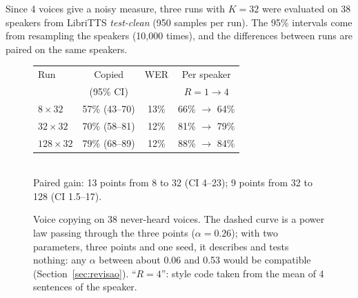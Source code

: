 \documentclass[a4paper,11pt]{article}
\begin{document}
Since 4 voices give a noisy measure, three runs with $K=32$ were evaluated on 38 speakers from LibriTTS \textit{test-clean} (950 samples per run). The 95\% intervals come from resampling the speakers (10,000 times), and the differences between runs are paired on the same speakers.

\begin{figure}[H]
\centering
\begin{minipage}{0.48\textwidth}
\centering
{}
\end{minipage}\hfill
\begin{minipage}{0.48\textwidth}
\small
\begin{tabular}{@{}lccc@{}}
\toprule
Run & Copied & WER & Per speaker\\
 & (95\% CI) & & $R=1 \rightarrow 4$\\
\midrule
$8\times32$ & 57\% (43--70) & 13\% & 66\% $\rightarrow$ 64\%\\
$32\times32$ & 70\% (58--81) & 12\% & 81\% $\rightarrow$ 79\%\\
$128\times32$ & 79\% (68--89) & 12\% & 88\% $\rightarrow$ 84\%\\
\bottomrule
\end{tabular}\\[6pt]
Paired gain: 13 points from 8 to 32 (CI 4--23); 9 points from 32 to 128 (CI 1.5--17).
\end{minipage}
\caption{Voice copying on 38 never-heard voices. The dashed curve is a power law passing through the three points ($\alpha=0.26$); with two parameters, three points and one seed, it describes and tests nothing: any $\alpha$ between about 0.06 and 0.53 would be compatible (Section~\ref{sec:revisao}). ``$R=4$'': style code taken from the mean of 4 sentences of the speaker.}
\label{fig:larga}
\end{figure}
\end{document}
